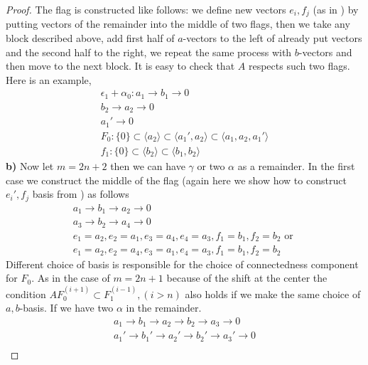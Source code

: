\documentclass[12pt]{amsart}
\theoremstyle{definition}
\theoremstyle{remark}
\numberwithin{equation}{subsection}
\begin{document}
\begin{proof}
The flag is constructed like follows: we define new vectors $e_i,f_j$ (as in \cite{GL}) by putting vectors of the remainder into the middle of two flags, then we take any block described above, add first half of $a$-vectors to the left of already put vectors and the second half to the right, we repeat the same process with $b$-vectors and then move to the next block. It is easy to check that $A$ respects such two flags. Here is an example,
\begin{equation}
\begin{gathered}
\epsilon_1 +\alpha_0\colon 
    a_1 \rightarrow b_1 \rightarrow 0\\
    b_2 \rightarrow a_2 \rightarrow 0\\
    a_1' \rightarrow  0\\
    F_0\colon  \{0\}\subset \langle a_2 \rangle\subset \langle a_1',a_2 \rangle\subset \langle a_1,a_2,a_1'\rangle\\
    f_1\colon  \{0\}\subset \langle b_2\rangle \subset \langle b_1,b_2\rangle
\end{gathered}
\end{equation}
\textbf{b)} Now let $m=2n+2$ then we can have $\gamma$ or two $\alpha$ as a remainder. In the first case we construct the middle of the flag (again here we show how to construct $e_i',f_j$ basis from \cite{GL}) as follows
\begin{equation}
\begin{gathered}
    a_1 \rightarrow b_1 \rightarrow a_2 \rightarrow 0\\
    a_3 \rightarrow b_2 \rightarrow a_4 \rightarrow 0\\
    e_{1}=a_2,e_{2}=a_1, e_{3}=a_4, e_{4}=a_3, f_{1}=b_1,f_{2}=b_2 \text{ or }\\
    e_{1}=a_2,e_{2}=a_4, e_{3}=a_1, e_{4}=a_3, f_{1}=b_1,f_{2}=b_2
\end{gathered}
\end{equation}
Different choice of basis is responsible for the choice of connectedness component for $F_0$. As in the case of $m=2n+1$ because of the shift at the center the condition $AF_0^{(i+1)}\subset F_1^{(i-1)}, (i>n)$ also holds if we make the same choice of $a,b$-basis. If we have two $\alpha$ in the remainder.
\begin{equation}
\begin{gathered}
    a_1 \rightarrow b_1 \rightarrow a_2 \rightarrow b_2 \rightarrow a_3 \rightarrow 0\\
    a_1' \rightarrow b_1' \rightarrow a_2' \rightarrow b_2' \rightarrow a_3' \rightarrow 0\\

\end{gathered}
\end{equation}
\end{proof}
\end{document}
